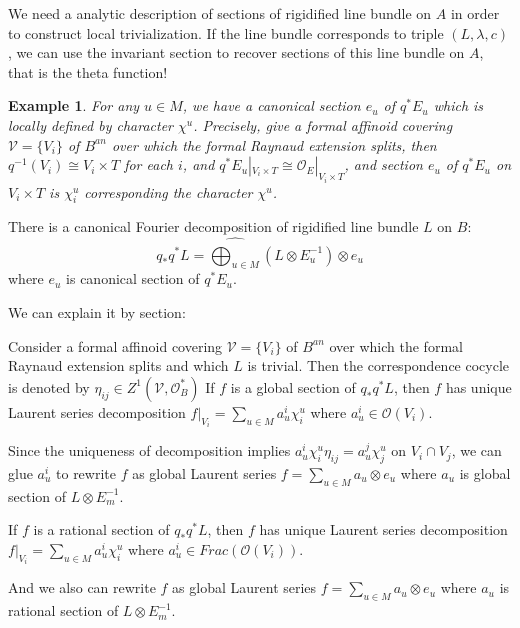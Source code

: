 \documentclass[10pt,a4paper]{amsart}
\theoremstyle{plain}
\newtheorem{example}[theorem]{Example}
\theoremstyle{plain}
\numberwithin{equation}{section}
\begin{document}
We need a analytic description of sections of rigidified line bundle on $A$ in order to construct local trivialization. If the line bundle corresponds to triple $(L,\lambda,c)$, we can use the invariant section to recover sections of this line bundle on $A$, that is the theta function!
\begin{example}
	For any $u\in M$, we have a canonical section $e_u$ of $q^*E_u$ which is locally defined by character $\chi^u$. Precisely, give a formal affinoid covering $\mathscr{V}=\{V_i\}$ of $B^{an}$ over which the formal Raynaud extension splits, then $q^{-1}(V_i)\cong V_i\times T$ for each $i$, and $q^*E_u|_{V_i\times T}\cong \mathscr{O}_E|_{V_i\times T}$, and section $e_u$ of $q^*E_u$ on $V_i\times T$ is $\chi^u_i$ corresponding the character $\chi^u$.
\end{example}
There is a canonical Fourier decomposition of rigidified line bundle $L$ on $B$:
$$q_*q^*L=\widehat{\bigoplus_{u\in M}}(L\otimes{E}_u^{-1})\otimes e_u$$
where $e_u$ is canonical section of $q^*E_u$.


We can explain it by section:


Consider a formal affinoid covering $\mathscr{V}=\{V_i\}$ of $B^{an}$ over which the formal Raynaud extension splits and which $L$ is trivial. Then the correspondence cocycle is denoted by
$\eta_{ij}\in Z^1(\mathscr{V},\mathscr{O}_B^*)$
If $f$ is a global section of $q_*q^*L$, then $f$ has unique Laurent series decomposition 
$f|_{V_i}=\sum_{u\in M}a_u^i\chi^u_i$
where $a_u^i\in \mathscr{O}(V_i)$.


Since the uniqueness of decomposition implies
$a_u^i\chi^u_i\eta_{ij}=a_u^j\chi^u_j$
on $V_i\cap V_j$, we can glue $a_u^i$ to rewrite $f$ as global Laurent series 
$f=\sum_{u\in M}a_u\otimes e_u$
where $a_u$ is global section of $L\otimes E_m^{-1}$.


If $f$ is a rational section of $q_*q^*L$, then $f$ has unique Laurent series decomposition 
$f|_{V_i}=\sum_{u\in M}a_u^i\chi^u_i$
where $a_u^i\in Frac(\mathscr{O}(V_i))$.


And we also can rewrite $f$ as global Laurent series
$f=\sum_{u\in M}a_u\otimes e_u$
where $a_u$ is rational section of $L\otimes E_m^{-1}$.
\end{document}
